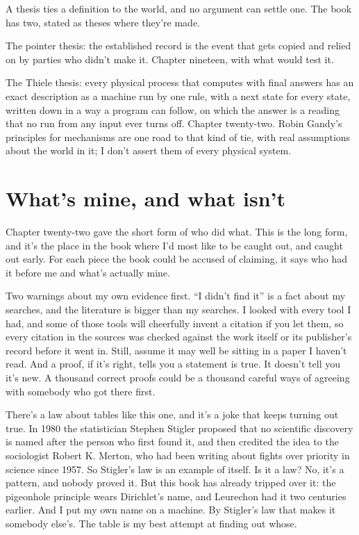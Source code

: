 \documentclass[11pt,twoside]{article}
\theoremstyle{thielethm}
\theoremstyle{thieledef}
\theoremstyle{thieledef}
\theoremstyle{thieledef}
\theoremstyle{thielethm}
\theoremstyle{thieleobs}
\theoremstyle{thielethm}
\begin{document}
A thesis ties a definition to the world, and no argument can settle one. The book has two, stated as theses where they're made.

The pointer thesis: the established record is the event that gets copied and relied on by parties who didn't make it. Chapter nineteen, with what would test it.

The Thiele thesis: every physical process that computes with final answers has an exact description as a machine run by one rule, with a next state for every state, written down in a way a program can follow, on which the answer is a reading that no run from any input ever turns off. Chapter twenty-two. Robin Gandy's principles for mechanisms are one road to that kind of tie, with real assumptions about the world in it; I don't assert them of every physical system.

\section{What's mine, and what isn't}
\label{sec:whats-mine}

Chapter twenty-two gave the short form of who did what. This is the long form, and it's the place in the book where I'd most like to be caught out, and caught out early. For each piece the book could be accused of claiming, it says who had it before me and what's actually mine.

Two warnings about my own evidence first. ``I didn't find it'' is a fact about my searches, and the literature is bigger than my searches. I looked with every tool I had, and some of those tools will cheerfully invent a citation if you let them, so every citation in the sources was checked against the work itself or its publisher's record before it went in. Still, assume it may well be sitting in a paper I haven't read. And a proof, if it's right, tells you a statement is true. It doesn't tell you it's new. A thousand correct proofs could be a thousand careful ways of agreeing with somebody who got there first.

There's a law about tables like this one, and it's a joke that keeps turning out true. In 1980 the statistician Stephen Stigler proposed that no scientific discovery is named after the person who first found it, and then credited the idea to the sociologist Robert K. Merton, who had been writing about fights over priority in science since 1957. So Stigler's law is an example of itself. Is it a law? No, it's a pattern, and nobody proved it. But this book has already tripped over it: the pigeonhole principle wears Dirichlet's name, and Leurechon had it two centuries earlier. And I put my own name on a machine. By Stigler's law that makes it somebody else's. The table is my best attempt at finding out whose.
\end{document}
